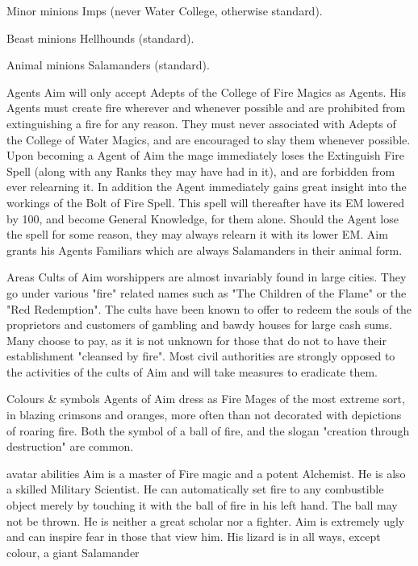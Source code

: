 \begin{example}
\begin{Description}
\item[Minor minions] Imps (never Water College, otherwise standard).

\item[Beast minions] Hellhounds (standard).

\item[Animal minions] Salamanders (standard).

\item[Agents] Aim will only accept Adepts of the College of Fire Magics
as Agents.  His Agents must create fire wherever and whenever possible
and are prohibited from extinguishing a fire for any reason.  They
must never associated with Adepts of the College of Water Magics, and
are encouraged to slay them whenever possible.  Upon becoming a Agent
of Aim the mage immediately loses the Extinguish Fire Spell (along
with any Ranks they may have had in it), and are forbidden from ever
relearning it.  In addition the Agent immediately gains great insight
into the workings of the Bolt of Fire Spell.  This spell will
thereafter have its EM lowered by 100, and become General Knowledge,
for them alone. Should the Agent lose the spell for some reason, they
may always relearn it with its lower EM. Aim grants his Agents
Familiars which are always Salamanders in their animal form.

\item[Areas] Cults of Aim worshippers are almost invariably found in
large cities.  They go under various "fire" related names such as "The
Children of the Flame" or the "Red Redemption".  The cults have been
known to offer to redeem the souls of the proprietors and customers of
gambling and bawdy houses for large cash sums.  Many choose to pay, as
it is not unknown for those that do not to have their establishment
"cleansed by fire". Most civil authorities are strongly opposed to the
activities of the cults of Aim and will take measures to eradicate
them.

\item[Colours \& symbols] Agents of Aim dress as Fire Mages of the most
extreme sort, in blazing crimsons and oranges, more often than not
decorated with depictions of roaring fire.  Both the symbol of a ball
of fire, and the slogan "creation through destruction" are common.

\item[avatar abilities] Aim is a master of Fire magic and a potent
Alchemist.  He is also a skilled Military Scientist. He can
automatically set fire to any combustible object merely by touching it
with the ball of fire in his left hand.  The ball may not be thrown.
He is neither a great scholar nor a fighter.  Aim is extremely ugly
and can inspire fear in those that view him. His lizard is in all
ways, except colour, a giant Salamander


\end{Description}
\end{example}

